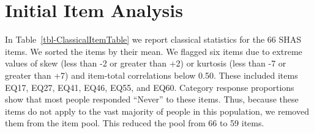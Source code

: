 \documentclass[
  letterpaper,
  DIV=11,
  numbers=noendperiod]{scrreport}
\begin{document}
\hypertarget{initial-item-analysis}{%
\section*{Initial Item Analysis}\label{initial-item-analysis}}

In Table~\ref{tbl-ClassicalItemTable} we report classical statistics for
the 66 SHAS items. We sorted the items by their mean. We flagged six
items due to extreme values of skew (less than -2 or greater than +2) or
kurtosis (less than -7 or greater than +7) and item-total correlations
below 0.50. These included items EQ17, EQ27, EQ41, EQ46, EQ55, and EQ60.
Category response proportions show that most people responded ``Never''
to these items. Thus, because these items do not apply to the vast
majority of people in this population, we removed them from the item
pool. This reduced the pool from 66 to 59 items.
\end{document}
